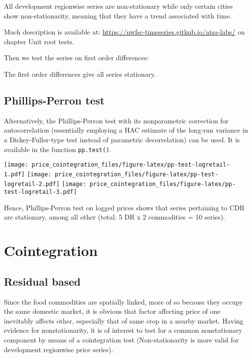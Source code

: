 \documentclass[12pt,]{article}
\begin{document}
All development regionwise series are non-stationary while only certain cities show non-stationarity, meaning that they have a trend associated with time.

Much description is available at: \url{https://nwfsc-timeseries.github.io/atsa-labs/} on chapter Unit root tests.

Then we test the series on first order differences:

The first order differences give all series stationary.

\hypertarget{phillips-perron-test}{%
\subsection{Phillips-Perron test}\label{phillips-perron-test}}

Alternatively, the Phillips-Perron test with its nonparametric correction for autocorrelation (essentially employing a HAC estimate of the long-run variance in a Dickey-Fuller-type test instead of parametric decorrelation) can be used. It is available in the function \texttt{pp.test()}.

\texttt{[image: price\_cointegration\_files/figure-latex/pp-test-logretail-1.pdf]} \texttt{[image: price\_cointegration\_files/figure-latex/pp-test-logretail-2.pdf]} \texttt{[image: price\_cointegration\_files/figure-latex/pp-test-logretail-3.pdf]}

Hence, Phillips-Perron test on logged prices shows that series pertaining to CDR are stationary, among all other (total: 5 DR x 2 commodities = 10 series).

\hypertarget{cointegration}{%
\section{Cointegration}\label{cointegration}}

\hypertarget{residual-based}{%
\subsection{Residual based}\label{residual-based}}

Since the food commodities are spatially linked, more of so because they occupy the same domestic market, it is obvious that factor affecting price of one inevitably affects other, especially that of same crop in a nearby market. Having evidence for nonstationarity, it is of interest to test for a common nonstationary component by means of a cointegration test (Non-stationarity is more valid for development regionwise price series).
\end{document}
